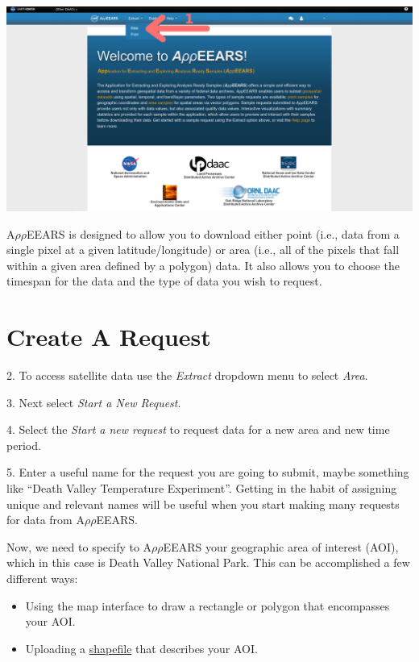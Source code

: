 \documentclass[oneside,a4paper,11pt,explicit]{book}
\begin{document}
\vspace{.5em}

\centerline{\includegraphics[width=\textwidth]{AppEEARShome.png}}

A$\rho\rho$EEARS is designed to allow you to download either point (i.e., data from a single pixel at a given latitude/longitude) or area (i.e., all of the pixels that fall within a given area defined by a polygon) data. It also allows you to choose the timespan for the data and the type of data you wish to request.  

\section{Create A Request}
2. To access satellite data use the \textit{Extract} dropdown menu to select \textit{Area}. 

3. Next select \textit{Start a New Request}.

4. Select the \textit{Start a new request} to request data for a new area and new time period.

5. Enter a useful name for the request you are going to submit, maybe something like ``Death Valley Temperature Experiment''. Getting in the habit of assigning unique and relevant names will be useful when you start making many requests for data from A$\rho\rho$EEARS.

\vspace{1em}

Now, we need to specify to A$\rho\rho$EEARS your geographic area of interest (AOI), which in this case is Death Valley National Park. This can be accomplished a few different ways:

\begin{itemize}
	\item Using the map interface to draw a rectangle or polygon that encompasses your AOI.
	\item Uploading a \href{https://en.wikipedia.org/wiki/Shapefile}{shapefile} that describes your AOI.	
\end{itemize}
\end{document}
